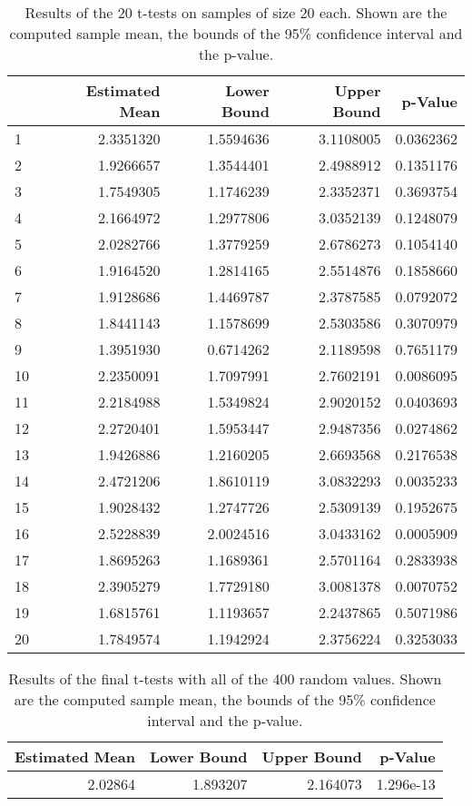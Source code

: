 \documentclass{paper}
\begin{document}
\begin{table}[!h]
\centering
\begin{tabular}{lrrrr}
  \hline
 & Estimated Mean & Lower Bound & Upper Bound & p-Value \\ 
  \hline
1 & 2.3351320 & 1.5594636 & 3.1108005 & 0.0362362 \\ 
  2 & 1.9266657 & 1.3544401 & 2.4988912 & 0.1351176 \\ 
  3 & 1.7549305 & 1.1746239 & 2.3352371 & 0.3693754 \\ 
  4 & 2.1664972 & 1.2977806 & 3.0352139 & 0.1248079 \\ 
  5 & 2.0282766 & 1.3779259 & 2.6786273 & 0.1054140 \\ 
  6 & 1.9164520 & 1.2814165 & 2.5514876 & 0.1858660 \\ 
  7 & 1.9128686 & 1.4469787 & 2.3787585 & 0.0792072 \\ 
  8 & 1.8441143 & 1.1578699 & 2.5303586 & 0.3070979 \\ 
  9 & 1.3951930 & 0.6714262 & 2.1189598 & 0.7651179 \\ 
  10 & 2.2350091 & 1.7097991 & 2.7602191 & 0.0086095 \\ 
  11 & 2.2184988 & 1.5349824 & 2.9020152 & 0.0403693 \\ 
  12 & 2.2720401 & 1.5953447 & 2.9487356 & 0.0274862 \\ 
  13 & 1.9426886 & 1.2160205 & 2.6693568 & 0.2176538 \\ 
  14 & 2.4721206 & 1.8610119 & 3.0832293 & 0.0035233 \\ 
  15 & 1.9028432 & 1.2747726 & 2.5309139 & 0.1952675 \\ 
  16 & 2.5228839 & 2.0024516 & 3.0433162 & 0.0005909 \\ 
  17 & 1.8695263 & 1.1689361 & 2.5701164 & 0.2833938 \\ 
  18 & 2.3905279 & 1.7729180 & 3.0081378 & 0.0070752 \\ 
  19 & 1.6815761 & 1.1193657 & 2.2437865 & 0.5071986 \\ 
  20 & 1.7849574 & 1.1942924 & 2.3756224 & 0.3253033 \\ 
   \hline
\end{tabular}
\caption{Results of the 20 t-tests on samples of size 20 each. Shown are the computed sample mean, the bounds of the 95\% confidence interval and the p-value.}
\label{tab:res1}
\end{table}

\begin{table}[!h]
\centering
\begin{tabular}{rrrr}
  \hline
 Estimated Mean & Lower Bound & Upper Bound & p-Value \\ 
  \hline
2.02864 & 1.893207 & 2.164073 & 1.296e-13 \\ 
   \hline
\end{tabular}
\caption{Results of the final t-tests with all of the 400 random values. Shown are the computed sample mean, the bounds of the 95\% confidence interval and the p-value.}
\label{tab:res2}
\end{table}


 
\end{document}

